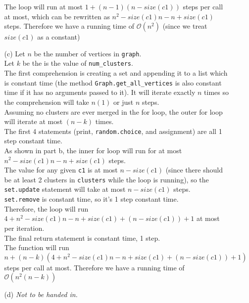 \documentclass[11pt]{article}
\begin{document}
\begin{enumerate}
\begin{enumerate}
The loop will run at most $1 + (n - 1)(n - size(c1))$ steps per call at most, which can be rewritten as $n^2 - size(c1)n - n + size(c1)$ steps. Therefore we have a running time of $\mathcal{O}(n^2)$ (since we treat $size(c1)$ as a constant) \\


\item[(c)]
Let $n$ be the number of vertices in \texttt{graph}. \\
Let $k$ be the is the value of \texttt{num\_clusters}. \\

The first comprehension is creating a set and appending it to a list which is constant time (the method \texttt{Graph.get\_all\_vertices} is also constant time if it has no arguments passed to it). It will iterate exactly $n$ times so the comprehension will take $n(1)$ or just $n$ steps. \\

Assuming no clusters are ever merged in the for loop, the outer for loop will iterate at most $(n - k)$ times. \\
The first 4 statements (print, \texttt{random.choice}, and assignment) are all 1 step constant time. \\
As shown in part b, the inner for loop will run for at most $n^2 - size(c1)n - n + size(c1)$ steps. \\
The value for any given \texttt{c1} is at most $n - size(c1)$ (since there should be at least 2 clusters in \texttt{clusters} while the loop is running), so the \texttt{set.update} statement will take at most $n - size(c1)$ steps. \\
\texttt{set.remove} is constant time, so it's 1 step constant time.\\
Therefore, the loop will run $4 + n^2 - size(c1)n - n + size(c1) + (n - size(c1)) + 1$ at most per iteration. \\

The final return statement is constant time, 1 step.\\

The function will run $n + (n - k)(4 + n^2 - size(c1)n - n + size(c1) + (n - size(c1)) + 1)$ steps per call at most. Therefore we have a running time of $\mathcal{O}(n^2(n - k))$ \\

\item[(d)]
\emph{Not to be handed in.}
\end{enumerate}

\end{enumerate}
\end{document}
